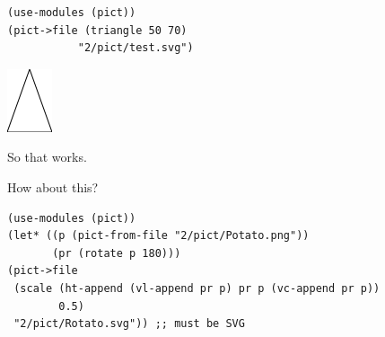 \documentclass[final,fleqn,titlepage,twoside]{article}
\begin{document}
\begin{verbatim}
(use-modules (pict))
(pict->file (triangle 50 70)
           "2/pict/test.svg")
\end{verbatim}

\begin{center}
\includegraphics[width=.9\linewidth]{2/pict/test.png}
\end{center}

So that works.

How about this?

\begin{verbatim}
(use-modules (pict))
(let* ((p (pict-from-file "2/pict/Potato.png"))
       (pr (rotate p 180)))
(pict->file
 (scale (ht-append (vl-append pr p) pr p (vc-append pr p))
        0.5)
 "2/pict/Rotato.svg")) ;; must be SVG
\end{verbatim}
\end{document}
